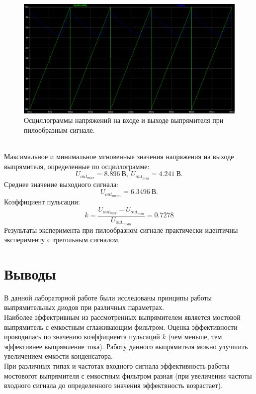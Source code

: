 \documentclass[12pt]{article}
\begin{document}
\begin{figure}[H]
    \centering
    \includegraphics[width=\textwidth]{4_saw_voltages.png}
    \caption{Осциллограммы напряжений на входе и выходе выпрямителя при пилообразным сигнале.}
    \label{fig:4_saw_voltages.png}
\end{figure}\\

Максимальное и минимальное мгновенные значения напряжения на выходе выпрямителя, определенные по осциллограмме:
\[
U_{out_{max}} = 8.896 \ \text{В}, \ U_{out_{min}} = 4.241 \ \text{В}.
\]
Среднее значение выходного сигнала:
\[
U_{{out}_{mean}} = 6.3496 \ \text{В}.
\]
Коэффициент пульсации:
\[
k = \frac{U_{out_{max}} - U_{out_{min}}}{U_{{out}_{mean}}} = 0.7278
\]
Результаты эксперимента при пилообразном сигнале практически идентичны эксперименту с трегольным сигналом.

\section*{Выводы}
В данной лабораторной работе были исследованы принципы работы выпрямительных диодов при различных параметрах.\\
Наиболее эффектривным из рассмотренных выпрямителем является мостовой выпрямитель с емкостным сглаживающим фильтром. Оценка эффективности проводилась по значению коэффициента пульсаций $k$ (чем меньше, тем эффективнее выпрямление тока).
Работу данного выпрямителя можно улучшить увеличением емкости конденсатора.\\
При различных типах и частотах входного сигнала эффективность работы мостовогот выпрямителя с емкостным фильтром разная (при увеличении частоты входного сигнала до определенного значения эффектвность возрастает). 
\end{document}
